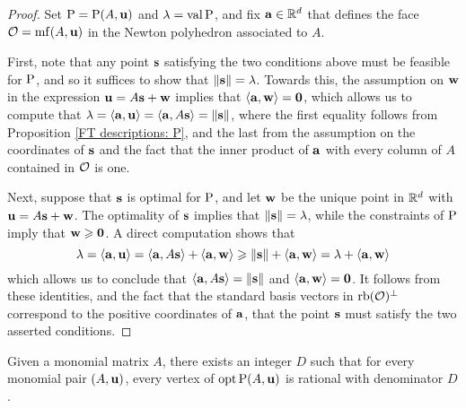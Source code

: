 \documentclass[11pt]{amsart}
\renewcommand{\!}[1]{{\color{red}\text{$\star$\,}#1\,$\star$}}
\begin{document}
\begin{proof}  
Set $\mathrm{P} = \mathrm{P}(A, \mathbf{u})$ and $\lambda = \operatorname{val} \mathrm{P}$, and fix $\mathbf{a} \in \mathbb{R}^d$ that defines the face $\mathcal{O} = \operatorname{mf}(A, \mathbf{u})$ in the Newton polyhedron associated to $A$. 

First, note that any point $\mathbf{s}$ satisfying the two conditions above must be feasible for $\mathrm{P}$, and so it suffices to show that $\| \mathbf{s} \| = \lambda$.  Towards this, the assumption on $\mathbf{w}$ in the expression $\mathbf{u} = A \mathbf{s} + \mathbf{w}$ implies that $\langle \mathbf{a}, \mathbf{w} \rangle = \mathbf{0}$, which allows us to compute that $\lambda = \langle \mathbf{a}, \mathbf{u} \rangle = \langle \mathbf{a}, A\mathbf{s} \rangle = \| \mathbf{s} \|$, where the first equality follows from 
Proposition \ref{FT descriptions: P}, and the last from the assumption on the coordinates of $\mathbf{s}$ and the fact that the inner product of $\mathbf{a}$ with every column of $A$ contained in $\mathcal{O}$ is one.

Next, suppose that $\mathbf{s}$ is optimal for $\mathrm{P}$, and let $\mathbf{w}$ be the unique point in $\mathbb{R}^d$ with $\mathbf{u} = A \mathbf{s} + \mathbf{w}$.  The optimality of $\mathbf{s}$ implies that $\| \mathbf{s} \| = \lambda$, while the constraints of $\mathrm{P}$ imply that $\mathbf{w} \geqslant \mathbf{0}$.  A direct computation shows that
%
\[ \lambda = \langle \mathbf{a}, \mathbf{u} \rangle = \langle \mathbf{a}, A \mathbf{s} \rangle + \langle \mathbf{a}, \mathbf{w} \rangle \geqslant \| \mathbf{s} \| + \langle \mathbf{a}, \mathbf{w} \rangle = \lambda + \langle \mathbf{a}, \mathbf{w} \rangle \]
%
which allows us to conclude that $\langle \mathbf{a}, A \mathbf{s} \rangle = \| \mathbf{s} \|$ and $\langle \mathbf{a}, \mathbf{w} \rangle = \mathbf{0}$.  It follows from these identities, and the fact that the standard basis vectors in $\operatorname{rb}(\mathcal{O})^{\perp}$ correspond to the positive coordinates of $\mathbf{a}$, that the point $\mathbf{s}$ must satisfy the two asserted conditions.
\end{proof}



\begin{theorem}  
\label{uniform denominators for vertices:  T}
Given a monomial matrix $A$, there exists an integer $D$ such that for every monomial pair $(A, \mathbf{u})$, every vertex of $\operatorname{opt} \mathrm{P}(A, \mathbf{u})$ is rational with denominator $D$.
\end{theorem}
\end{document}
